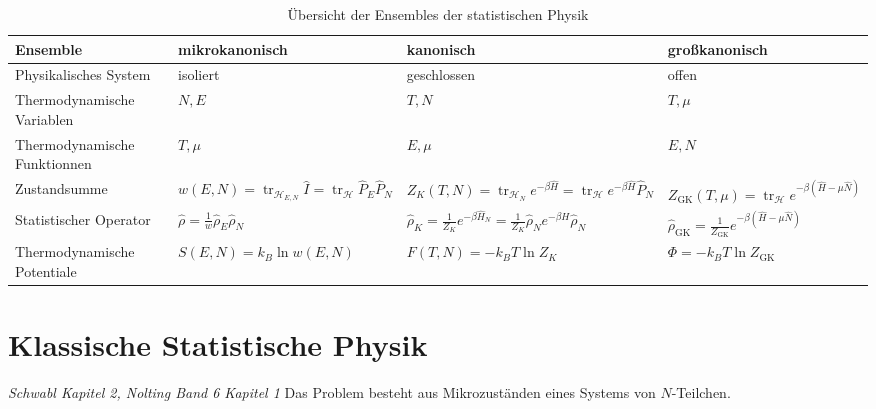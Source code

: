 \documentclass[11pt]{article}
\theoremstyle{plain}
\theoremstyle{mytheoremstyle}
\newcommand{\trace}{\operatorname{tr}}
\begin{document}
\begin{table}[htpb]
  \centering
  \begin{tabular}{p{4.5cm}|p{3cm}|p{3cm}|p{3cm}}
    Ensemble & mikrokanonisch & kanonisch & gro\ss{}kanonisch \\
    \hline 
    Physikalisches System & isoliert & geschlossen & offen \\
    \hline 
    Thermodynamische Variablen & $N, E$ & $T,N$ & $T, \mu$ \\
    \hline 
    Thermodynamische Funktionnen & $T, \mu$ & $E, \mu$ & $E, N$ \\ 
    \hline 
    Zustandsumme & $w(E, N) = \trace_{\mathcal{H}_{E,N}} \hat{I} = 
    \trace_{\mathcal{H}} \hat{P}_E \hat{P}_N$ & $Z_K (T, N) = 
    \trace_{\mathcal{H}_N} e ^{-\beta \hat{H}} = 
    \trace_{\mathcal{H}} e^{-\beta \hat{H}} \hat{P}_N$ & 
    $Z_{\text{GK}}(T, \mu) = \trace_{\mathcal{H}} e^{-\beta(\hat{H} -\mu \hat{N})}$ \\
    \hline 
    Statistischer Operator & 
    $ \hat{\rho} = \frac{1}{w} \hat{\rho}_E \hat{\rho}_N$ & 
    $\hat{\rho}_K = \frac{1}{Z_K} e^{-\beta \hat{H}_N}
    = \frac{1}{Z_K} \hat{\rho}_N e ^{-\beta H} \hat{\rho}_N$ & 
    $\hat{\rho}_{\text{GK}} = \frac{1}{Z_{\text{GK}}} e^{-\beta (\hat{H} - \mu \hat{N})}$ \\
    \hline 
    Thermodynamische Potentiale & $S(E, N) = k_B \ln{ w (E, N)}$ & 
    $F(T, N) = -k_B T \ln{Z_K}$ & $\Phi = -k_B T \ln{Z_{\text{GK}}}$ \\
    \hline 
  \end{tabular}
  \caption{\"Ubersicht der Ensembles der statistischen Physik}
\end{table}
%

\section*{Klassische Statistische Physik}
\emph{Schwabl Kapitel 2, Nolting Band 6 Kapitel 1}
Das Problem besteht aus Mikrozust\"anden eines Systems von $N$-Teilchen.
%
\end{document}
